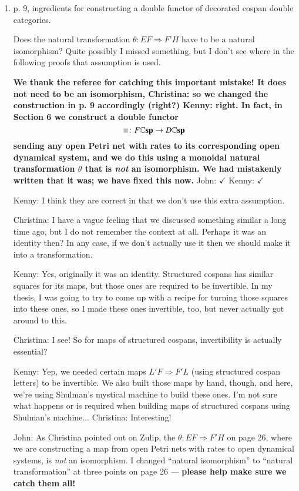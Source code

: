 \documentclass[reqno]{amsart}
\newcommand*{\graysquare}{\textcolor{lightgray}{\blacksquare}}
\newcommand{\double}[1]{\mathbf{\mathbb #1}}
\newcommand{\lCsp}{\double{Csp}}
\def\chris{\color{purple} Christina: }
\def\john{\color{red} John: }
\def\kenny{\color{blue} Kenny: }
\begin{document}
\begin{enumerate}
{\bf We have moved the natural isomorphism triangle as equation (1) in the statement of Theorem 2.1, and we have referred to it at page 10.} {\chris 
$\checkmark$} {\kenny $\checkmark$}

\item p. 9, ingredients for constructing a double functor of decorated cospan double categories.

Does the natural transformation $\theta \colon EF \Rightarrow F’ H$ have to be a natural isomorphism? Quite possibly I missed something, but I don’t see where in 
the following proofs that assumption is used.

{\bf We thank the referee for catching this important mistake!   It does not need to be an isomorphism, {\chris so we changed the construction in p. 
9 accordingly} (right?) {\kenny right}.
In fact, in Section 6 we construct a double functor
\[      \graysquare \colon F \lCsp \to D \lCsp \]
sending any open Petri net with rates to its corresponding open dynamical system, and we do this
using a monoidal natural transformation $\theta$ that is \emph{not} an isomorphism.  We had mistakenly written that it was; we have fixed this now.}
{\john $\checkmark$} {\kenny $\checkmark$}

{\kenny I think they are correct in that we don't use this extra assumption.}

{\chris I have a vague feeling that we discussed something similar a long time ago, but I do not remember the context at all. Perhaps it was an 
identity then? In any case, if we don't actually use it then we should make it into a transformation.}

{\kenny Yes, originally it was an identity. Structured cospans has similar squares for its maps, but those ones are required to be invertible. In my 
thesis, I was going to try to come up with a recipe for turning those squares into these ones, so I made these ones invertible, too, but never 
actually got around to this.}

{\chris I see! So for maps of structured cospans, invertibility is actually essential?}

{\kenny Yep, we needed certain maps $L' F \Rightarrow F' L$ (using structured cospan letters) to be invertible. We also built those maps by hand, 
though, and here, we're using Shulman's mystical machine to build these ones. I'm not sure what happens or is required when building maps of 
structured cospans using Shulman's machine...} {\chris Interesting!}

{\john  As Christina pointed out on Zulip, the $\theta : EF \Rightarrow F'H$ on page 26, where we are
constructing a map from open Petri nets with rates to open dynamical systems, is \emph{not} an
isomorphism.  I changed ``natural isomorphism'' to ``natural transformation'' at three points on page 26 --- 
{\bf please help make sure we catch them all!}

}
\end{enumerate}
\end{document}
